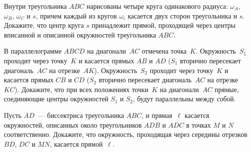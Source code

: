 \begin{problems}

\item
Внутри треугольника $ABC$ нарисованы четыре круга одинакового радиуса:
$\omega_A$, $\omega_B$, $\omega_C$ и $s$, причем каждый из кругов $\omega_i$
касается двух сторон треугольника и $s$.
Докажите, что центр круга $s$ принадлежит прямой, проходящей через центры
вписанной и описанной окружностей треугольника $ABC$.




\item
В параллелограмме $ABCD$ на диагонали~$AC$ отмечена точка~$K$.
Окружность~$S_1$ проходит через точку~$K$ и касается прямых $AB$ и $AD$
($S_1$ вторично пересекает диагональ~$AC$ на отрезке~$AK$).
Окружность~$S_2$ проходит через точку~$K$ и касается прямых $CB$ и $CD$
($S_2$ вторично пересекает диагональ~$AC$ на отрезке~$KC$).
Докажите, что при всех положениях точки~$K$ на диагонали~$AC$ прямые,
соединяющие центры окружностей $S_1$ и $S_2$, будут параллельны между собой.

\item
Пусть $AD$~--- биссектриса треугольника $ABC$, и прямая~$\ell$ касается
окружностей, описанных около треугольников $ADB$ и $ADC$ в точках $M$ и $N$
соответственно.
Докажите, что окружность, проходящая через середины отрезков $BD$, $DC$ и $MN$,
касается прямой~$\ell$.

\end{problems}

